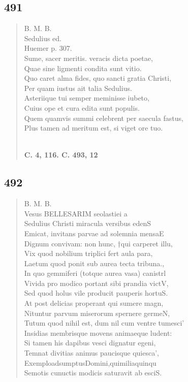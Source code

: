 \documentclass[11pt, a4paper]{report}
\begin{document}
            \subsection*{491}
      \begin{verse}
      B. M. B. \\ Sedulius ed. \\ Huemer p. 307. \\ Sume, sacer meritis. veracis dicta poetae, \\ Quae sine ligmenti condita sunt vitio. \\ Quo caret alma fides, quo sancti gratia Christi, \\ Per quam iustus ait talia Sedulius. \\ Asteriique tui semper meminisse iubeto, \\ Cuius ope et cura edita sunt populis. \\ Quem quamvis summi celebrent per saecula fastus, \\ Plus tamen ad meritum est, si viget ore tuo. \\ 
        ﻿\pagebreak 
    \begin{center} \textbf{C. 4, 116. C. 493, 12} \end{center} \marginpar{[49]} 
      \end{verse}
  
            \subsection*{492}
      \begin{verse}
      B. M. B. \\ Vesus BELLESARIM seolastiei a \\ Sedulius Christi miracula versibus edenS \\ Emicat, invitans parvae ad solemnia mensaE \\ Dignum convivam: non hunc, †qui carperet illu, \\ Vix quod nobilium triplici fert aula para, \\ Laetum quod ponit sub aurea tecta tribuna., \\ In quo gemmiferi (totque aurea vasa) canistrl \\ Vivida pro modico portant sibi prandia victV, \\ Sed quod holus vile producit pauperis hortuS. \\ At post delicias properant qui sumere magn, \\ Nituntur parvum miserorum spernere germeN, \\ Tutum quod nihil est, dum nil cum ventre tumesci’ \\ Insidias membrisque movens animaeque ludent: \\ Si tamen his dapibus vesci dignatur egeni, \\ Temnat divitias animus paucisque quiesca’, \\ ExemploadsumptusDomini,quimiliaquinqu \\ Semotis cunuctis modicis saturavit ab esciS. \\ 
      \end{verse}
  
\end{document}
